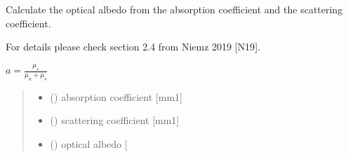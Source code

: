 \documentclass[letterpaper,10pt,english]{sphinxmanual}
\begin{document}
\begin{fulllineitems}
\label{\detokenize{04_scattering_coefficient:skinoptics.scattering_coefficient.albedo}}
\pysigstartsignatures
{}
\pysigstopsignatures
\begin{DUlineblock}{0em}
\item[] Calculate the optical albedo from the absorption coefficient and the scattering coefficient.
\item[] For details please check section 2.4 from Niemz 2019 {[}N19{]}.
\end{DUlineblock}

\sphinxAtStartPar
\(a = \frac{\mu_s}{\mu_a + \mu_s}\)
\begin{quote}\begin{description}
\begin{itemize}
\item {} 
\sphinxAtStartPar
{} () \textendash{} absorption coefficient {[}mm\sphinxhyphen{}1{]}

\item {} 
\sphinxAtStartPar
{} () \textendash{} scattering coefficient {[}mm\sphinxhyphen{}1{]}

\end{itemize}

\sphinxAtStartPar
\begin{itemize}
\item {} 
\sphinxAtStartPar
{} () \textendash{} optical albedo {[}\sphinxhyphen{}{]}

\end{itemize}


\end{description}\end{quote}

\end{fulllineitems}
\end{document}
